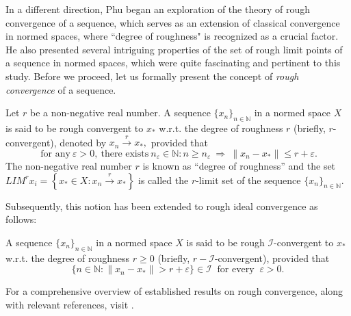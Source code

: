 \documentclass[reqno]{amsart}
\begin{document}
In a different direction, Phu \cite{phu2001rough,xuan2003rough} began an exploration of the theory of rough convergence of a sequence, which serves as an extension of classical convergence in normed spaces, where ``degree of roughness" is recognized as a crucial factor. He also presented several intriguing properties of the set of rough limit points of a sequence in normed spaces, which were quite fascinating and pertinent to this study. Before we proceed, let us formally present the concept of \textit{rough convergence} of a sequence.
\begin{definition}\cite[Page no. 199]{phu2001rough} \cite[Eq (1.1)]{xuan2003rough} Let $r$ be a non-negative real number. A sequence  $\{x_n\}_{n\in \mathbb{N}}$ in a normed space $X$ is said to be  rough convergent  to $x_*$ w.r.t. the degree of roughness $r$ (briefly, $r$-convergent), denoted by $x_n\xrightarrow{r}x_*,$  provided that
	\begin{equation*}~\mbox{for any}~ \varepsilon > 0,~\mbox{there exists}~ n_{\varepsilon} \in \mathbb{N}: n\geq n_{\varepsilon} ~\Rightarrow~ \|x_n - x_*\| \leq  r+ \varepsilon.\end{equation*}
	The  non-negative real number $r$ is known as ``degree of roughness'' and the set $LIM^r x_i=\left\{x_*\in X: x_n\xrightarrow{r}x_*\right\}$ is called the $r$-limit set of the sequence $\{x_n\}_{n\in \mathbb{N}}.$
\end{definition}
Subsequently, this notion has been extended to rough ideal convergence as follows:
\begin{definition}\cite{dundar2014rough,PCD}
	A sequence  $\{x_n\}_{n\in \mathbb{N}}$ in a normed space $X$ is said to be  rough $\mathcal{I}$-convergent  to $x_*$ w.r.t. the degree of roughness $r\geq 0$ (briefly, $r-\mathcal{I}$-convergent),  provided that
	\begin{equation*}
		\{n\in\mathbb{N}:\|x_n - x_*\|>  r+ \varepsilon\}\in\mathcal{I}
		~\mbox{ for every }~ \varepsilon > 0.\end{equation*}
\end{definition}
For a comprehensive overview of established results on rough convergence, along with relevant references, visit \cite{aytarcore,aytar2008rough,aytar2017rough,listan2011characterization,rahaman2024rough}.\\
\end{document}
